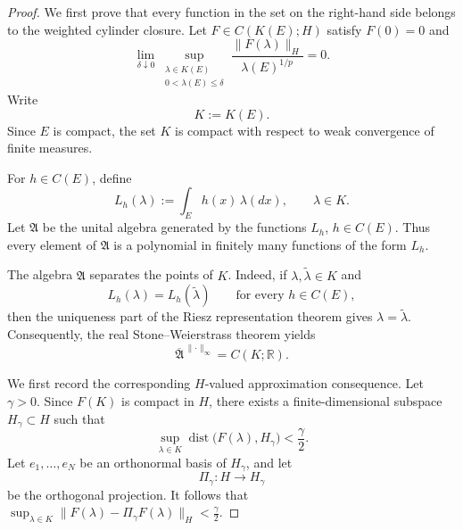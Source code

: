 \documentclass[a4paper,10pt]{article}
\begin{document}
\begin{proof}
We first prove that every function in the set on the right-hand side
belongs to the weighted cylinder closure. Let
$
        F\in C(K(E);H)
$
satisfy \(F(0)=0\) and
\[
\lim_{\delta\downarrow0}
\sup_{\substack{\lambda\in K(E)\\
                 0<\lambda(E)\le\delta}}
\frac{\lVert F(\lambda)\rVert_H}
     {\lambda(E)^{1/p}}
=
0.
\]
Write
\[
        K:=K(E).
\]
Since \(E\) is compact, the set \(K\) is compact with respect to weak
convergence of finite measures.

For \(h\in C(E)\), define
\[
        L_h(\lambda)
        :=
        \int_E h(x)\,\lambda(dx),
        \qquad \lambda\in K.
\]
Let \(\mathfrak A\) be the unital algebra generated by the functions
\(L_h\), \(h\in C(E)\). Thus every element of \(\mathfrak A\) is a
polynomial in finitely many functions of the form \(L_h\).

The algebra \(\mathfrak A\) separates the points of \(K\). Indeed, if
\(\lambda,\widetilde\lambda\in K\) and
\[
        L_h(\lambda)=L_h(\widetilde\lambda)
        \qquad\text{for every }h\in C(E),
\]
then the uniqueness part of the Riesz representation theorem gives
$
        \lambda=\widetilde\lambda.
$
Consequently, the real Stone--Weierstrass theorem yields
\[
        \overline{\mathfrak A}^{\,\lVert\cdot\rVert_\infty}
        =
        C(K;\mathbb R).
\]

We first record the corresponding \(H\)-valued approximation
consequence. Let \(\gamma>0\). Since \(F(K)\) is compact in \(H\), there
exists a finite-dimensional subspace \(H_\gamma\subset H\) such that
\[
        \sup_{\lambda\in K}
        \operatorname{dist}
        \bigl(F(\lambda),H_\gamma\bigr)
        <
        \frac{\gamma}{2}.
\]
Let
$
        e_1,\ldots,e_N
$
be an orthonormal basis of \(H_\gamma\), and let
\[
        \Pi_\gamma:H\longrightarrow H_\gamma
\]
be the orthogonal projection. It follows that
$
        \sup_{\lambda\in K}
        \lVert F(\lambda)-\Pi_\gamma F(\lambda)\rVert_H
        <
        \frac{\gamma}{2}.
$


\end{proof}
\end{document}
